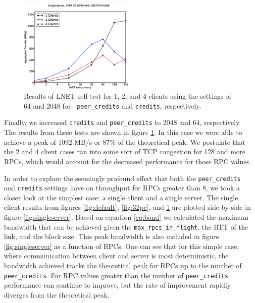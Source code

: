 \documentclass[]{sigplan-proc}
\begin{document}
\begin{figure}
\centering
\includegraphics[width=0.50\textwidth]{figures/64pc_plot.eps}
\caption{Results of LNET self-test for 1, 2, and 4 clients using the settings of 64 and 2048 for {\tt
    peer\_credits} and {\tt credits}, respectively.}
\label{fig:64pc}
\end{figure}

Finally, we increased {\tt credits} and {\tt peer\_credits} to 2048 and 64, respectively. The results from
these tests are shown in figure \ref{fig:64pc}. In this case we were able to achieve a peak of 1092 MB/s or
87\% of the theoretical peak. We postulate that the 2 and 4 client cases ran into some sort of TCP congestion for
128 and more RPCs, which would account for the decreased performance for those RPC values.

In order to explore the seemingly profound effect that both the {\tt peer\_credits} and {\tt credits} settings
have on throughput for RPCs greater than 8, we took a closer look at the simplest case: a single client and a
single server. The single client results from figures \ref{fig:default}, \ref{fig:32pc}, and \ref{fig:64pc}
are plotted side-by-side in figure \ref{fig:singleserver}. Based on equation \ref{eq:band} we calculated the
maximum bandwidth that can be achieved given the {\tt max\_rpcs\_in\_flight}, the RTT of the link, and the
block size.  This peak bandwidth is also included in figure \ref{fig:singleserver} as a function of RPCs. One
can see that for this simple case, where communication between client and server is most deterministic, the
bandwidth achieved tracks the theoretical peak for RPCs up to the number of {\tt peer\_credits}. For RPC
values greater than the number of {\tt peer\_credits} performance can continue to improve, but the rate of
improvement rapidly diverges from the theoretical peak.
\end{document}
